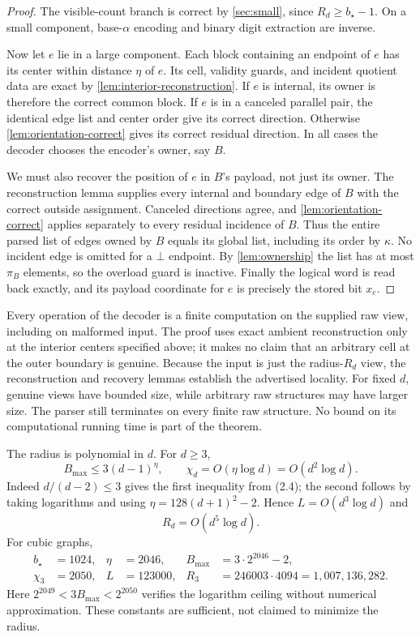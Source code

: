 \documentclass[11pt]{article}
\theoremstyle{definition}
\theoremstyle{remark}
\begin{document}
\begin{proof}
The visible-count branch is correct by \cref{sec:small}, since
$R_d\ge b_\star-1$.  On a small component, base-$\alpha$ encoding and
binary digit extraction are inverse.

Now let $e$ lie in a large component.  Each block containing an endpoint
of $e$ has its center within distance $\eta$ of $e$.  Its cell, validity
guards, and incident quotient data are exact by
\cref{lem:interior-reconstruction}.  If $e$ is internal, its owner is
therefore the correct common block.  If $e$ is in a canceled parallel
pair, the identical edge list and center order give its correct
direction.  Otherwise \cref{lem:orientation-correct} gives its correct
residual direction.  In all cases the decoder chooses the encoder's owner,
say $B$.

We must also recover the position of $e$ in $B$'s payload, not just its
owner.  The reconstruction lemma supplies every internal and boundary
edge of $B$ with the correct outside assignment.  Canceled directions
agree, and \cref{lem:orientation-correct} applies separately to every
residual incidence of $B$.  Thus the entire parsed list of edges owned
by $B$ equals its global list, including its order by $\kappa$.
No incident edge is omitted for a $\bot$ endpoint.  By
\cref{lem:ownership} the list has at most $\pi_B$ elements, so the
overload guard is inactive.  Finally the logical word is read back exactly,
and its payload coordinate for $e$ is precisely the stored bit $x_e$.
\end{proof}

Every operation of the decoder is a finite computation on the supplied
raw view, including on malformed input.  The proof uses exact ambient
reconstruction only at the interior centers specified above; it makes
no claim that an arbitrary cell at the outer boundary is genuine.
Because the input is just the radius-$R_d$ view, the reconstruction and
recovery lemmas establish the advertised locality.  For fixed $d$,
genuine views have bounded size, while arbitrary raw structures may have
larger size.  The parser still terminates on every finite raw structure.
No bound on its computational running time is part of the theorem.

The radius is polynomial in $d$.  For $d\ge3$,
\[
 B_{\max}\le3(d-1)^\eta,\qquad
 \chi_d=O(\eta\log d)=O(d^2\log d).
\]
Indeed $d/(d-2)\le3$ gives the first inequality from (2.4);
the second follows by taking logarithms and using
$\eta=128(d+1)^2-2$.  Hence $L=O(d^3\log d)$ and
\[
 R_d=O(d^5\log d).                                            \tag{10.5}
\]
For cubic graphs,
\begin{align*}
 b_\star&=1024,& \eta&=2046,&
 B_{\max}&=3\cdot2^{2046}-2,\\
 \chi_3&=2050,& L&=123000,&
 R_3&=246003\cdot4094=1{,}007{,}136{,}282.                     \tag{10.6}
\end{align*}
Here $2^{2049}<3B_{\max}<2^{2050}$ verifies the logarithm ceiling
without numerical approximation.  These constants are sufficient, not
claimed to minimize the radius.
\end{document}
